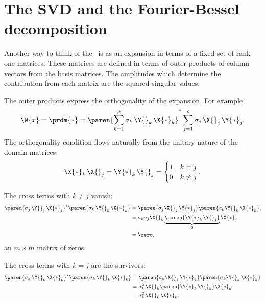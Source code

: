 \section{The SVD and the Fourier-Bessel decomposition}

Another way to think of the \svdp \ is as an expansion in terms of a fixed set of rank one matrices. These matrices are defined in terms of outer products of column vectors from the basis matrices. The amplitudes which determine the contribution from each matrix are the squared singular values.

The outer products express the orthogonality of the expansion. For example
\begin{equation}
  \begin{split}
    \W{x} = \prdm{*} = \paren{\sum_{k=1}^{\rho}{\sigma_{k}\, \Y{}_{k}\, \X{*}_{k}}}^{*}\sum_{j=1}^{\rho}{\sigma_{j}\, \X{}_{j}\, \Y{*}_{j}}.
  \end{split}
\end{equation}
The orthogonality condition flows naturally from the unitary nature of the domain matrices:
\begin{equation}
  \X{*}_{k}\,\X{}_{j} = \Y{*}_{k}\,\Y{}_{j} =
  \begin{cases}
    1 & k = j\\
    0 & k \ne j
  \end{cases}.
\end{equation}

The cross terms with $k\ne j$ vanish:
\begin{equation}
  \begin{split}
    \paren{\sigma_{j}\, \Y{}_{j}\, \X{*}_{j}}^{*}\paren{\sigma_{k}\, \Y{}_{k}\, \X{*}_{k}} &= \paren{\sigma_{j}\X{}_{j}\, \Y{*}_{j}}\paren{\sigma_{k}\Y{}_{k}\, \X{*}_{k}}, \\
    &= \sigma_{k}\sigma_{j}\X{}_{k}\underbrace{\paren{\Y{*}_{k}\,\Y{}_{j}}}_{0}\X{*}_{j}\\
    & = \zero,
  \end{split}
\end{equation}
an $m\times m$ matrix of zeros.

The cross terms with $k=j$ are the survivors:
\begin{equation}
  \begin{split}
    \paren{\sigma_{k}\, \Y{}_{k}\, \X{*}_{k}}^{*}\paren{\sigma_{k}\, \Y{}_{k}\, \X{*}_{k}}&= \paren{\sigma_{k}\X{}_{k}\, \Y{*}_{k}}\paren{\sigma_{k}\Y{}_{k}\, \X{*}_{k}} \\
    &= \sigma_{k}^{2}\,\X{}_{k}\paren{\Y{*}_{k}\,\Y{}_{k}}\X{*}_{k}\\
    &= \sigma_{k}^{2}\,\X{}_{k}\,\X{*}_{k}.
  \end{split}
\end{equation}

